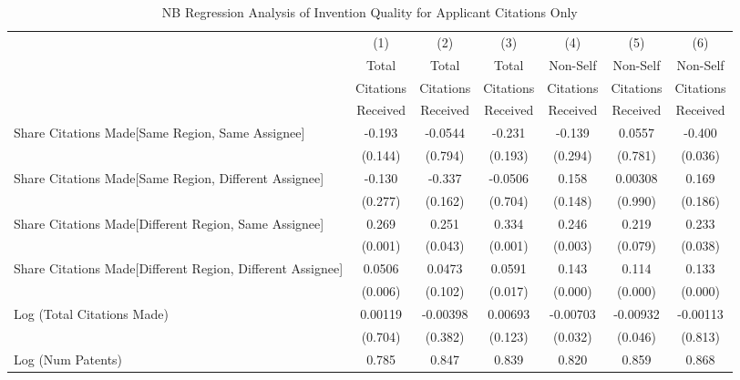 \begin{table}[htbp]\centering \caption{NB Regression Analysis of Invention Quality for Applicant Citations Only \label{a.model123192021}} 
\scriptsize
\singlespacing
\begin{tabular}{l*{6}{c}} \hline\hline
                &\multicolumn{1}{c}{(1)}&\multicolumn{1}{c}{(2)}&\multicolumn{1}{c}{(3)}&\multicolumn{1}{c}{(4)}&\multicolumn{1}{c}{(5)}&\multicolumn{1}{c}{(6)}\\
                &\multicolumn{1}{c}{Total}&\multicolumn{1}{c}{Total}&\multicolumn{1}{c}{Total}&\multicolumn{1}{c}{Non-Self}&\multicolumn{1}{c}{Non-Self}&\multicolumn{1}{c}{Non-Self}\\
                &\multicolumn{1}{c}{Citations}&\multicolumn{1}{c}{Citations}&\multicolumn{1}{c}{Citations}&\multicolumn{1}{c}{Citations}&\multicolumn{1}{c}{Citations}&\multicolumn{1}{c}{Citations}\\
                 &\multicolumn{1}{c}{Received}&\multicolumn{1}{c}{Received}&\multicolumn{1}{c}{Received}&\multicolumn{1}{c}{Received}&\multicolumn{1}{c}{Received}&\multicolumn{1}{c}{Received}\\
\hline
Share Citations Made[Same Region, Same Assignee]&   -0.193&  -0.0544&   -0.231&   -0.139&   0.0557&   -0.400\\
                &  (0.144)&  (0.794)&  (0.193)&  (0.294)&  (0.781)&  (0.036)\\
Share Citations Made[Same Region, Different Assignee]&   -0.130&   -0.337&  -0.0506&    0.158&  0.00308&    0.169\\
                &  (0.277)&  (0.162)&  (0.704)&  (0.148)&  (0.990)&  (0.186)\\
Share Citations Made[Different Region, Same Assignee]&    0.269&    0.251&    0.334&    0.246&    0.219&    0.233\\
                &  (0.001)&  (0.043)&  (0.001)&  (0.003)&  (0.079)&  (0.038)\\
Share Citations Made[Different Region, Different Assignee]&   0.0506&   0.0473&   0.0591&    0.143&    0.114&    0.133\\
                &  (0.006)&  (0.102)&  (0.017)&  (0.000)&  (0.000)&  (0.000)\\
Log (Total Citations Made)&  0.00119& -0.00398&  0.00693& -0.00703& -0.00932& -0.00113\\
                &  (0.704)&  (0.382)&  (0.123)&  (0.032)&  (0.046)&  (0.813)\\
Log (Num Patents)&    0.785&    0.847&    0.839&    0.820&    0.859&    0.868\\

\end{tabular}
\end{table}
